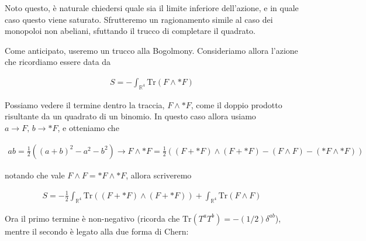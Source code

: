 \documentclass{report}
\begin{document}
Noto questo, è naturale chiedersi quale sia il limite inferiore dell'azione, e in quale caso questo viene saturato. Sfrutteremo un ragionamento simile al caso dei monopoloi non abeliani, sfuttando il trucco di completare il quadrato. 


Come anticipato, useremo un trucco alla Bogolmony. Consideriamo allora l'azione che ricordiamo essere data da 

\begin{align}
    S = -\int_{\mathbb{R}^4}\text{Tr}(F\wedge *F)
\end{align}

Possiamo vedere il termine dentro la traccia, \(F \wedge *F\), come il doppio prodotto risultante da un quadrato di un binomio. In questo caso allora usiamo \(a \rightarrow F, \, b \rightarrow *F\), e otteniamo che 

\begin{align}
    ab = \frac{1}{2}\left((a + b)^2 - a^2 - b^2\right) \rightarrow F\wedge *F = \frac{1}{2}\left((F+*F)\wedge (F+*F) - (F\wedge F) - (*F \wedge *F)\right)
\end{align}

notando che vale \(F \wedge F = *F \wedge *F\), allora scriveremo

\begin{align}
    S = -\frac{1}{2}\int_{\mathbb{R}^4}\text{Tr}((F+*F)\wedge (F+*F)) + \int_{\mathbb{R}^4}\text{Tr}(F\wedge F) 
\end{align}

Ora il primo termine è non-negativo (ricorda che \(\text{Tr}(T^aT^b) = -(1/2)\delta^{ab}\)), mentre il secondo è legato alla due forma di Chern:  
\end{document}
